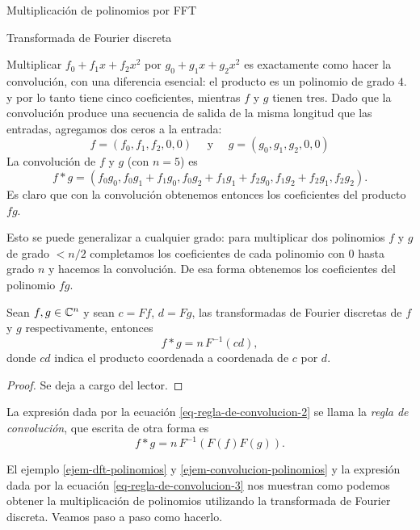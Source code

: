 \begin{chapter}{Multiplicación de polinomios por FFT}
\begin{section}{Transformada de Fourier discreta}
\begin{ejemplo}
      Multiplicar $f_0 + f_1x + f_2x^2$ por $g_0 + g_1x + g_2x^2$ es exactamente como hacer la convolución, con una diferencia esencial: el producto es un polinomio de grado $4$. y por lo tanto tiene cinco coeficientes, mientras $f$ y $g$ tienen tres. Dado que la convolución produce una secuencia de salida de la misma longitud que las entradas, agregamos dos ceros a la entrada:
      \begin{equation*}
          f = (f_0,f_1,f_2,0,0) \quad \text{ y }\quad g = (g_0,g_1,g_2,0,0)
      \end{equation*}
      La convolución de $f$ y $g$ (con $n = 5$) es
      \begin{equation*}
          f * g = (f_0g_0, f_0g_1 + f_1g_0 , f_0g_2 + f_1g_1+ f_2g_0, f_1g_2 + f_2g_1, f_2g_2 ).
      \end{equation*}
      Es claro que con la convolución obtenemos entonces  los coeficientes del producto $fg$.

      Esto se puede generalizar a cualquier grado:  para multiplicar dos polinomios $f$ y $g$ de grado $<n/2$ completamos los coeficientes de cada polinomio  con $0$ hasta grado $n$ y hacemos la convolución. De esa forma obtenemos los coeficientes del polinomio $fg$.
  \end{ejemplo}


  \begin{teorema}\label{th-prod-convolucion-dft}
      Sean $f,g \in \mathbb C^n$ y  sean $c= Ff$, $d = Fg$, las transformadas de Fourier discretas de $f$ y $g$ respectivamente, entonces
      \begin{equation}\label{eq-regla-de-convolucion-2}
          f * g = n\,  F^{-1}(cd),
      \end{equation}
      donde $cd$  indica el producto coordenada a coordenada de $c$ por $d$.
  \end{teorema}
  \begin{proof}
      Se deja a cargo del lector.
  \end{proof}

  La expresión dada por la ecuación  \eqref{eq-regla-de-convolucion-2} se llama la  \textit{regla de convolución},  que escrita de otra forma es
  \begin{equation}\label{eq-regla-de-convolucion-3}
    f * g = n\,  F^{-1}(F(f)F(g)).
    \end{equation}
  \begin{ejemplo*} El ejemplo \ref{ejem-dft-polinomios} y \ref{ejem-convolucion-polinomios} y  la expresión dada por la ecuación  \eqref{eq-regla-de-convolucion-3} nos  muestran como podemos obtener  la multiplicación de polinomios utilizando la transformada de Fourier discreta. Veamos paso a paso como hacerlo.


\end{ejemplo*}
\end{section}
\end{chapter}
